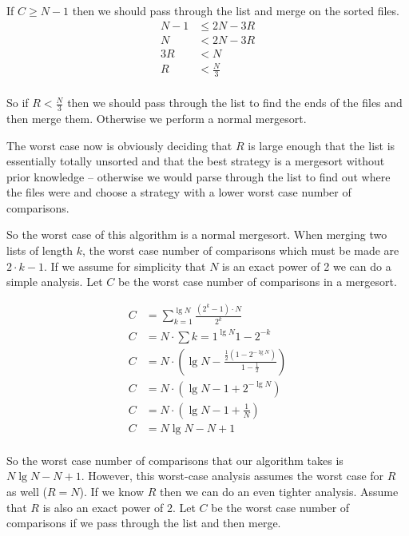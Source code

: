 \documentclass[10pt,\jkfside,a4paper]{article}
\begin{document}
\begin{enumerate}
If $C \geq N - 1$ then we should pass through the list and merge on the sorted files. 
\begin{equation}
\begin{split}
N - 1 &\leq 2N - 3R \\
N &< 2N - 3R \\
3R &< N\\
R &< \frac{N}{3} \\
\end{split}
\end{equation}

So if $R < \frac{N}{3}$ then we should pass through the list to find the ends of the files 
and then merge them. Otherwise we perform a normal mergesort.

The worst case now is obviously deciding that $R$ is large enough that the list is essentially 
totally unsorted and that the best strategy is a mergesort without prior knowledge -- 
otherwise we would parse through the list to find out where the files were and choose a strategy 
with a lower worst case number of comparisons.

So the worst case of this algorithm is a normal mergesort. When merging two lists of length 
$k$, the worst case number of comparisons which must be made are $2 \cdot k - 1$.
If we assume for simplicity that $N$ is an exact power of 2 we can do a simple analysis. 
Let $C$ be the worst case number of comparisons in a mergesort. 

\begin{equation}
\begin{split}
C &= \sum_{k=1}^{\lg{N}} \frac{(2^k - 1) \cdot N}{2^k} \\
C &= N \cdot \sum{k=1}^{\lg{N}} 1 - 2^{-k} \\
C &= N \cdot (\lg{N} - \frac{\frac{1}{2}(1 - 2^{-\lg{N}})}{1 - \frac{1}{2}}) \\
C &= N \cdot (\lg{N} - 1 + 2^{-\lg{N}}) \\
C &= N \cdot (\lg{N} - 1 + \frac{1}{N}) \\
C &= N\lg{N} - N + 1 \\
\end{split}
\end{equation}

So the worst case number of comparisons that our algorithm takes is $N\lg N - N + 1$. However, 
this worst-case analysis assumes the worst case for $R$ as well ($R = N$). If we know $R$ then 
we can do an even tighter analysis. Assume that $R$ is also an exact power of 2. Let $C$ be the 
worst case number of comparisons if we pass through the list and then merge.


\end{enumerate}
\end{document}
